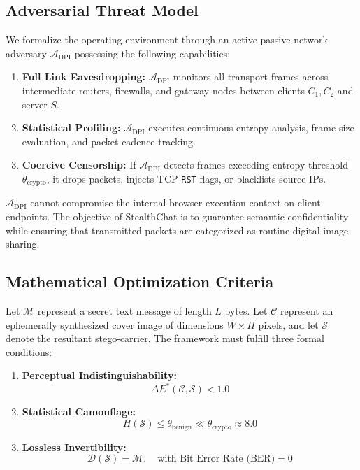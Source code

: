 \documentclass[conference]{IEEEtran}
\begin{document}
\subsection{Adversarial Threat Model}
We formalize the operating environment through an active-passive network adversary $\mathcal{A}_{\text{DPI}}$ possessing the following capabilities:
\begin{enumerate}
    \item \textbf{Full Link Eavesdropping:} $\mathcal{A}_{\text{DPI}}$ monitors all transport frames across intermediate routers, firewalls, and gateway nodes between clients $C_1, C_2$ and server $S$.
    \item \textbf{Statistical Profiling:} $\mathcal{A}_{\text{DPI}}$ executes continuous entropy analysis, frame size evaluation, and packet cadence tracking.
    \item \textbf{Coercive Censorship:} If $\mathcal{A}_{\text{DPI}}$ detects frames exceeding entropy threshold $\theta_{\text{crypto}}$, it drops packets, injects TCP \texttt{RST} flags, or blacklists source IPs.
\end{enumerate}

$\mathcal{A}_{\text{DPI}}$ cannot compromise the internal browser execution context on client endpoints. The objective of StealthChat is to guarantee semantic confidentiality while ensuring that transmitted packets are categorized as routine digital image sharing.

\subsection{Mathematical Optimization Criteria}
Let $\mathcal{M}$ represent a secret text message of length $L$ bytes. Let $\mathcal{C}$ represent an ephemerally synthesized cover image of dimensions $W \times H$ pixels, and let $\mathcal{S}$ denote the resultant stego-carrier. The framework must fulfill three formal conditions:
\begin{enumerate}
    \item \textbf{Perceptual Indistinguishability:} 
    \begin{equation}
        \Delta E^*(\mathcal{C}, \mathcal{S}) < 1.0
    \end{equation}
    \item \textbf{Statistical Camouflage:}
    \begin{equation}
        H(\mathcal{S}) \le \theta_{\text{benign}} \ll \theta_{\text{crypto}} \approx 8.0
    \end{equation}
    \item \textbf{Lossless Invertibility:}
    \begin{equation}
        \mathcal{D}(\mathcal{S}) = \mathcal{M}, \quad \text{with Bit Error Rate (BER)} = 0
    \end{equation}
\end{enumerate}
\end{document}
